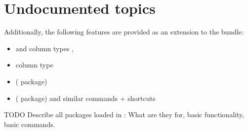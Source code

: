 


\section[Undocumented topics]{Undocumented topics}

Additionally, the following features are provided as an extension to the \KOMAScript{} bundle:
%
\begin{itemize}
   \item \latexcmd{\rowstyle} and column types \entity{=}, \entity{+}
   \item column type 
   \item \latexcmd{\noacronymfont} ( package)
   \item \latexcmd{\acrentryshort} ( package) and similar commands + shortcuts
\end{itemize}

\noindent{}TODO Describe all packages loaded in \wegcLaTeX{}: What are they
for, basic functionality, basic commands.

